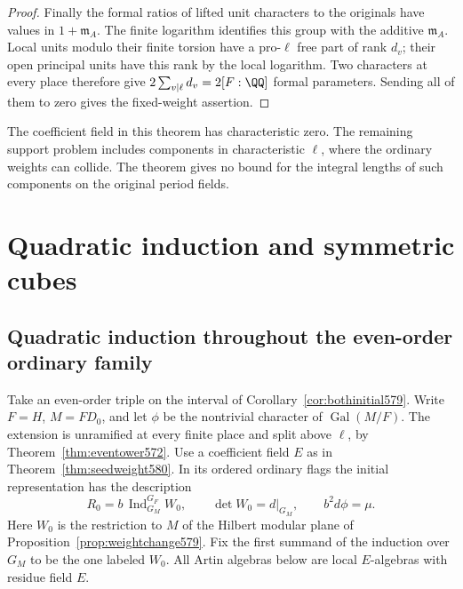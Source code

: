\documentclass[a4paper,11pt]{article}
\theoremstyle{definition}
\theoremstyle{remark}
\numberwithin{equation}{section}
\begin{document}
\begin{proof}
Finally the formal ratios of lifted unit characters to the
originals have values in \(1+\mathfrak m_A\). The finite logarithm
identifies this group with the additive \(\mathfrak m_A\).
Local units modulo their finite torsion have a pro-\(\ell\)
free part of rank \(d_v\); their open principal units have this
rank by the local logarithm. Two characters at every place
therefore give \(2\sum_{v\mid\ell}d_v=2[F:\QQ]\) formal
parameters. Sending all of them to zero gives the fixed-weight
assertion.
\end{proof}

The coefficient field in this theorem has characteristic zero.
The remaining support problem includes components in characteristic
\(\ell\), where the ordinary weights can collide. The theorem gives
no bound for the integral lengths of such components on the
original period fields.

\section{Quadratic induction and symmetric cubes}\label{nav:chapter-quadratic-induction-symmetric-cubes}

\subsection{Quadratic induction throughout the even-order ordinary family}
\label{sec:quadraticfamily583}

Take an even-order triple on the interval of
Corollary~\ref{cor:bothinitial579}. Write \(F=H\),
\(M=FD_0\), and let \(\phi\) be the nontrivial character of
\(\operatorname{Gal}(M/F)\). The extension is unramified at
every finite place and split above \(\ell\), by
Theorem~\ref{thm:eventower572}. Use a coefficient field \(E\)
as in Theorem~\ref{thm:seedweight580}. In its ordered ordinary
flags the initial representation has the description
\[
  R_0=b\,\operatorname{Ind}_{G_M}^{G_F}W_0,\qquad
  \det W_0=d|_{G_M},\qquad b^2 d\phi=\mu .
\]
Here \(W_0\) is the restriction to \(M\) of the Hilbert modular
plane of Proposition~\ref{prop:weightchange579}. Fix the first
summand of the induction over \(G_M\) to be the one labeled
\(W_0\). All Artin algebras below are local \(E\)-algebras
with residue field \(E\).
\end{document}
